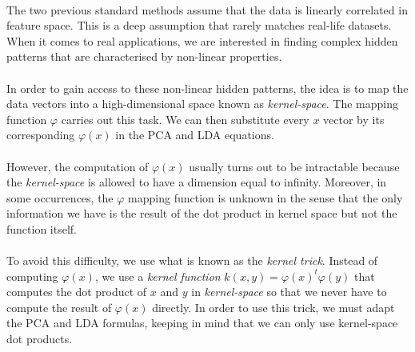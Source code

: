\paragraph{}
The two previous standard methods assume that the data is linearly correlated in feature space. This
is a deep assumption that rarely matches real-life datasets. When it comes to real applications, we
are interested in finding complex hidden patterns that are characterised by non-linear properties.

\paragraph{}
In order to gain access to these non-linear hidden patterns, the idea is to map the data vectors into
a high-dimensional space known as \emph{kernel-space}. The mapping function $\varphi$ carries out
this task. We can then substitute every $x$ vector by its corresponding $\varphi(x)$ in the PCA and
LDA equations.

\paragraph{}
However, the computation of $\varphi(x)$ usually turns out to be intractable because the
\emph{kernel-space} is allowed to have a dimension equal to infinity. Moreover, in some occurrences,
the $\varphi$ mapping function is unknown in the sense that the only information we have is the
result of the dot product in kernel space but not the function itself.

\paragraph{}
To avoid this difficulty, we use what is known as the \emph{kernel trick}. Instead of computing
$\varphi(x)$, we use a \emph{kernel function} $k(x, y) = \varphi(x)^t\varphi(y)$ that computes
the dot product of $x$ and $y$ in \emph{kernel-space} so that we never have to compute the result of
$\varphi(x)$ directly. In order to use this trick, we must adapt the PCA and LDA formulas, keeping in
mind that we can only use kernel-space dot products.
